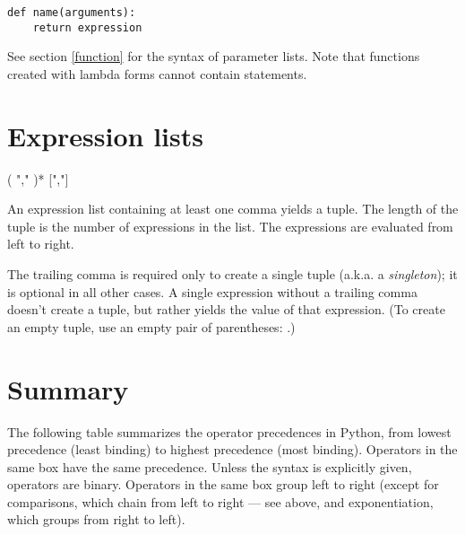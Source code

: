 \begin{verbatim}
def name(arguments):
    return expression
\end{verbatim}

See section \ref{function} for the syntax of parameter lists.  Note
that functions created with lambda forms cannot contain statements.
\label{lambda}

\section{Expression lists\label{exprlists}}

\begin{productionlist}
             { ( ","  )* [","]}
\end{productionlist}

An expression list containing at least one comma yields a
tuple.  The length of the tuple is the number of expressions in the
list.  The expressions are evaluated from left to right.

The trailing comma is required only to create a single tuple (a.k.a. a
\emph{singleton}); it is optional in all other cases.  A single
expression without a trailing comma doesn't create a
tuple, but rather yields the value of that expression.
(To create an empty tuple, use an empty pair of parentheses:
\code{()}.)


\section{Summary\label{summary}}

The following table summarizes the operator
precedences in Python, from lowest
precedence (least binding) to highest precedence (most binding).
Operators in the same box have the same precedence.  Unless the syntax
is explicitly given, operators are binary.  Operators in the same box
group left to right (except for comparisons, which chain from left to
right --- see above, and exponentiation, which groups from right to
left).

